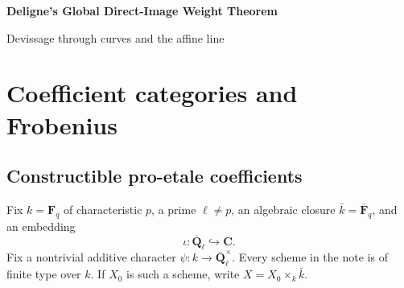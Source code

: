\documentclass[10pt]{article}
\theoremstyle{definition}
\newcommand{\Fq}{\mathbf F_q}
\newcommand{\Fbar}{\overline{\mathbf F}_q}
\newcommand{\Qlb}{\overline{\mathbf Q}_\ell}
\begin{document}
\begin{center}
{\large\bfseries Deligne's Global Direct-Image Weight Theorem\par}
\medskip
{\normalsize Devissage through curves and the affine line\par}
\end{center}

\begin{abstract}
Let \(f:X_0\to Y_0\) be separated and of finite type over a finite field.
Deligne's theorem asserts that \(Rf_!\) preserves upper weights, with the
cohomological shift built into the definition of the weight of a complex.
This note records a theorem-by-theorem route through finite stratification,
localization, finite and radicial descent, the Leray spectral sequence,
relative curves, and the affine-line estimate.  The unconditional route is
stated for mixed complexes whose pure graded pieces have integral weights.
The separate real-weight statement retains the additional local-Fourier
hypotheses under which it is valid.  All categories below are ordinary
triangulated categories.
\end{abstract}

\tableofcontents

\section{Coefficient categories and Frobenius}

\subsection{Constructible pro-etale coefficients}

Fix \(k=\Fq\) of characteristic \(p\), a prime \(\ell\ne p\), an algebraic
closure \(\bar k=\Fbar\), and an embedding
\[
                       \iota:\Qlb\hookrightarrow\mathbf C.
\]
Fix a nontrivial additive character \(\psi:k\to\Qlb^\times\).
Every scheme in the note is of finite type over \(k\).  If \(X_0\) is such
a scheme, write \(X=X_0\times_k\bar k\).
\end{document}
